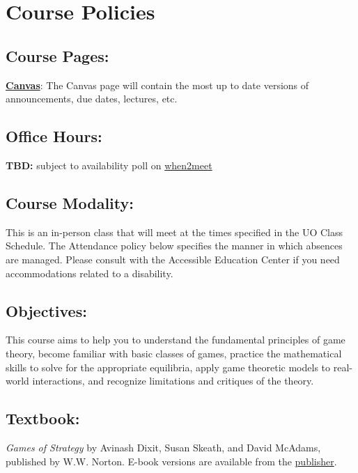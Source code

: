\section{Course Policies}
\subsection*{Course Pages:}

 \href{https://canvas.uoregon.edu/courses/233504}{\textbf{Canvas}}:
  The Canvas page will contain the most up to date versions of announcements, due dates, lectures, etc. 

\subsection*{Office Hours:} 

  \textbf{TBD:} subject to availability poll on \href{https://www.when2meet.com/?22894284-XLwIV}{when2meet}

\subsection*{Course Modality:}

This is an in-person class that will meet at the times specified in the UO Class Schedule. The Attendance policy below specifies the manner in which absences are managed. Please consult with the Accessible Education Center if you need accommodations related to a disability.

\subsection*{Objectives:}

This course aims to help you to understand the fundamental principles of game theory, become familiar with basic classes of games, practice the mathematical skills to solve for the appropriate equilibria, apply game theoretic models to real-world interactions, and recognize limitations and critiques of the theory.

\subsection*{Textbook:}

  \textit{Games of Strategy} by Avinash Dixit, Susan Skeath, and David McAdams, published by W.W. Norton.
  E-book versions are available from the \href{https://wwnorton.com/books/Games-of-Strategy}{publisher}.
  
